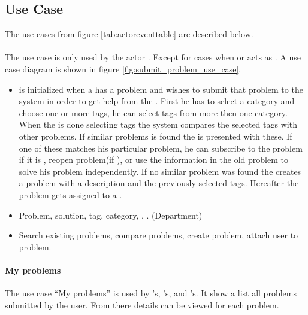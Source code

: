 \subsection{Use Case}
\label{sec:usecase}

The use cases from figure \ref{tab:actoreventtable} are described below.  

\paragraph{\ucsproblem[c]} The use case \ucsproblem[] is only used by the actor \aclient. Except for cases when \astaff{} or \sadmin{}  acts as \aclient{}. A use case diagram is shown in figure \ref{fig:submit_problem_use_case}. 
\begin{itemize}
\item {} \ucsproblem[c] is initialized when a \aclient{} has a problem and wishes to submit that problem to the system in order to get help from the \astaff{}. 
First he has to select a category and choose one or more tags, he can select tags from more then one category. 
When the \aclient{} is done selecting tags the system compares the selected tags with other problems. 
If similar problems is found the \aclient{} is presented with these.
If one of these matches his particular problem, he can subscribe to the problem if it is \open, reopen problem(if \closed{}), or use the information in the old problem to solve his problem independently. 
If no similar problem was found the \aclient{} creates a problem with a description and the previously selected tags. 
Hereafter the problem gets assigned to a \astaff{}. 

\item {} Problem, solution, tag, category, \client, \staff. (Department)

\item {} Search existing problems, compare problems, create problem, attach user to problem.
\end{itemize}

\paragraph{My problems} The use case ``My problems'' is used by  \aclient 's, \astaff 's, and \admin 's. It show a list all problems submitted by the user. From there details can be viewed for each problem. 


